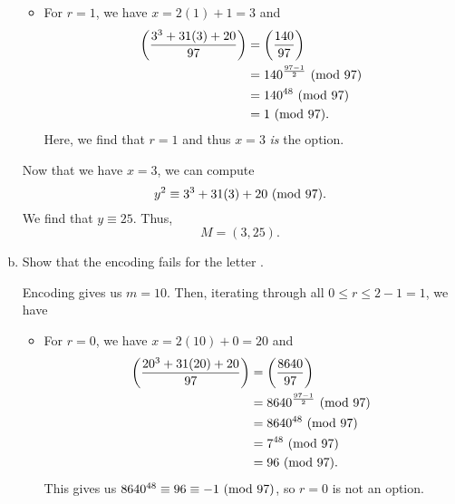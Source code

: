 \documentclass[letterpaper]{article}
\begin{document}
\begin{mdframed}
\begin{enumerate}[(a)]
\begin{mdframed}
\begin{itemize}
                \item For $r = 1$, we have $x = 2(1) + 1 = 3$ and 
                \begin{equation*}
                    \begin{aligned}
                        \left(\frac{3^3 + 31(3) + 20}{97}\right) &= \left(\frac{140}{97}\right) \\ 
                            &= 140^{\frac{97 - 1}{2}} \ (\mathrm{mod}\ 97) \\ 
                            &= 140^{48} \ (\mathrm{mod}\ 97) \\ 
                            &= 1 \ (\mathrm{mod}\ 97).
                    \end{aligned}
                \end{equation*}
                Here, we find that $r = 1$ and thus $x = 3$ \emph{is} the option. 
            \end{itemize}
            Now that we have $x = 3$, we can compute \[y^2 \equiv 3^3 + 31(3) + 20 \ (\mathrm{mod}\ 97).\] We find that $y \equiv 25$. Thus, \[M = (3, 25).\]
        \end{mdframed}
        \item Show that the encoding fails for the letter . 
        \begin{mdframed}
            Encoding  gives us $m = 10$. Then, iterating through all $0 \leq r \leq 2 - 1 = 1$, we have 
            \begin{itemize}
                \item For $r = 0$, we have $x = 2(10) + 0 = 20$ and 
                \begin{equation*}
                    \begin{aligned}
                        \left(\frac{20^3 + 31(20) + 20}{97}\right) &= \left(\frac{8640}{97}\right) \\ 
                            &= 8640^{\frac{97 - 1}{2}} \ (\mathrm{mod}\ 97) \\ 
                            &= 8640^{48} \ (\mathrm{mod}\ 97) \\ 
                            &= 7^{48} \ (\mathrm{mod}\ 97) \\ 
                            &= 96 \ (\mathrm{mod}\ 97).
                    \end{aligned}
                \end{equation*}
                This gives us $8640^{48} \equiv 96 \equiv -1 \ (\mathrm{mod}\ 97)$, so $r = 0$ is not an option. 


\end{itemize}
\end{mdframed}
\end{enumerate}
\end{mdframed}
\end{document}
